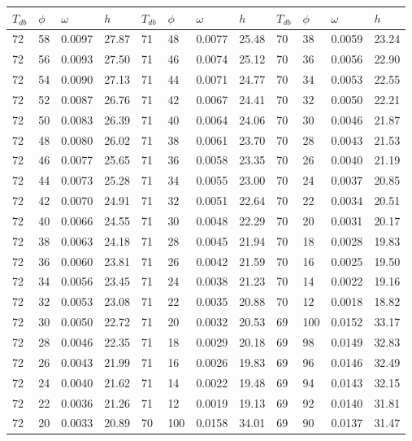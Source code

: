 \begin{tabular}{llll|llll|llll}
 \toprule 
\(T_{db}\) & \(\phi\) & \(\omega\) & \(h\) & \(T_{db}\) & \(\phi\) & \(\omega\) & \(h\) & \(T_{db}\) & \(\phi\) & \(\omega\) & \(h\)  \\ \midrule 
72 & 58 & 0.0097 & 27.87 & 71 & 48 & 0.0077 & 25.48 & 70 & 38 & 0.0059 & 23.24\\
72 & 56 & 0.0093 & 27.50 & 71 & 46 & 0.0074 & 25.12 & 70 & 36 & 0.0056 & 22.90\\
72 & 54 & 0.0090 & 27.13 & 71 & 44 & 0.0071 & 24.77 & 70 & 34 & 0.0053 & 22.55\\
72 & 52 & 0.0087 & 26.76 & 71 & 42 & 0.0067 & 24.41 & 70 & 32 & 0.0050 & 22.21\\
72 & 50 & 0.0083 & 26.39 & 71 & 40 & 0.0064 & 24.06 & 70 & 30 & 0.0046 & 21.87\\
72 & 48 & 0.0080 & 26.02 & 71 & 38 & 0.0061 & 23.70 & 70 & 28 & 0.0043 & 21.53\\
72 & 46 & 0.0077 & 25.65 & 71 & 36 & 0.0058 & 23.35 & 70 & 26 & 0.0040 & 21.19\\
72 & 44 & 0.0073 & 25.28 & 71 & 34 & 0.0055 & 23.00 & 70 & 24 & 0.0037 & 20.85\\
72 & 42 & 0.0070 & 24.91 & 71 & 32 & 0.0051 & 22.64 & 70 & 22 & 0.0034 & 20.51\\
72 & 40 & 0.0066 & 24.55 & 71 & 30 & 0.0048 & 22.29 & 70 & 20 & 0.0031 & 20.17\\
72 & 38 & 0.0063 & 24.18 & 71 & 28 & 0.0045 & 21.94 & 70 & 18 & 0.0028 & 19.83\\
72 & 36 & 0.0060 & 23.81 & 71 & 26 & 0.0042 & 21.59 & 70 & 16 & 0.0025 & 19.50\\
72 & 34 & 0.0056 & 23.45 & 71 & 24 & 0.0038 & 21.23 & 70 & 14 & 0.0022 & 19.16\\
72 & 32 & 0.0053 & 23.08 & 71 & 22 & 0.0035 & 20.88 & 70 & 12 & 0.0018 & 18.82\\
72 & 30 & 0.0050 & 22.72 & 71 & 20 & 0.0032 & 20.53 & 69 & 100 & 0.0152 & 33.17\\
72 & 28 & 0.0046 & 22.35 & 71 & 18 & 0.0029 & 20.18 & 69 & 98 & 0.0149 & 32.83\\
72 & 26 & 0.0043 & 21.99 & 71 & 16 & 0.0026 & 19.83 & 69 & 96 & 0.0146 & 32.49\\
72 & 24 & 0.0040 & 21.62 & 71 & 14 & 0.0022 & 19.48 & 69 & 94 & 0.0143 & 32.15\\
72 & 22 & 0.0036 & 21.26 & 71 & 12 & 0.0019 & 19.13 & 69 & 92 & 0.0140 & 31.81\\
72 & 20 & 0.0033 & 20.89 & 70 & 100 & 0.0158 & 34.01 & 69 & 90 & 0.0137 & 31.47\\

\end{tabular}
